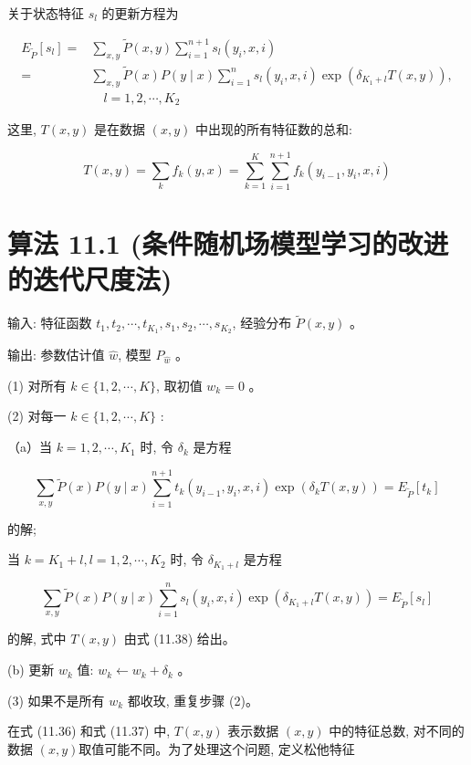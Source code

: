 \documentclass[10pt]{article}
\begin{document}
\begin{CJK*}{UTF8}{bsmi}
关于状态特征 $s_{l}$ 的更新方程为


\begin{align*}
E_{\tilde{P}}\left[s_{l}\right]= & \sum_{x, y} \tilde{P}(x, y) \sum_{i=1}^{n+1} s_{l}\left(y_{i}, x, i\right) \\
= & \sum_{x, y} \tilde{P}(x) P(y \mid x) \sum_{i=1}^{n} s_{l}\left(y_{i}, x, i\right) \exp \left(\delta_{K_{1}+l} T(x, y)\right), \\
& \quad l=1,2, \cdots, K_{2} \tag{11.37}
\end{align*}


这里, $T(x, y)$ 是在数据 $(x, y)$ 中出现的所有特征数的总和:


\begin{equation*}
T(x, y)=\sum_{k} f_{k}(y, x)=\sum_{k=1}^{K} \sum_{i=1}^{n+1} f_{k}\left(y_{i-1}, y_{i}, x, i\right) \tag{11.38}
\end{equation*}


\section*{算法 11.1 (条件随机场模型学习的改进的迭代尺度法)}
输入: 特征函数 $t_{1}, t_{2}, \cdots, t_{K_{1}}, s_{1}, s_{2}, \cdots, s_{K_{2}}$, 经验分布 $\tilde{P}(x, y)$ 。

输出: 参数估计值 $\hat{w}$, 模型 $P_{\hat{w}}$ 。

(1) 对所有 $k \in\{1,2, \cdots, K\}$, 取初值 $w_{k}=0$ 。

(2) 对每一 $k \in\{1,2, \cdots, K\}$ :

（a）当 $k=1,2, \cdots, K_{1}$ 时, 令 $\delta_{k}$ 是方程

$$
\sum_{x, y} \tilde{P}(x) P(y \mid x) \sum_{i=1}^{n+1} t_{k}\left(y_{i-1}, y_{i}, x, i\right) \exp \left(\delta_{k} T(x, y)\right)=E_{\tilde{P}}\left[t_{k}\right]
$$

的解;

当 $k=K_{1}+l, l=1,2, \cdots, K_{2}$ 时, 令 $\delta_{K_{1}+l}$ 是方程

$$
\sum_{x, y} \tilde{P}(x) P(y \mid x) \sum_{i=1}^{n} s_{l}\left(y_{i}, x, i\right) \exp \left(\delta_{K_{1}+l} T(x, y)\right)=E_{\tilde{P}}\left[s_{l}\right]
$$

的解, 式中 $T(x, y)$ 由式 (11.38) 给出。

(b) 更新 $w_{k}$ 值: $w_{k} \leftarrow w_{k}+\delta_{k}$ 。

(3) 如果不是所有 $w_{k}$ 都收玫, 重复步骤 (2)。

在式 (11.36) 和式 (11.37) 中, $T(x, y)$ 表示数据 $(x, y)$ 中的特征总数, 对不同的数据 $(x, y)$取值可能不同。为了处理这个问题, 定义松他特征



\end{CJK*}
\end{document}
